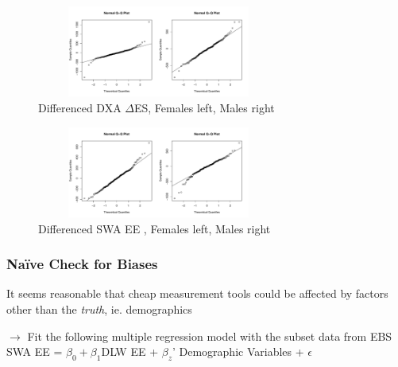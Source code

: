 \documentclass[handout]{beamer}\usepackage[]{graphicx}\usepackage[]{color}
\begin{document}
\begin{frame}

\begin{figure}
\centering
\includegraphics[width=8cm,height=3cm]{dxa_qq.pdf}
\caption{{Differenced DXA $\Delta$ES, Females left, Males right}}
\end{figure}

\begin{figure}
\centering
\includegraphics[width=8cm,height=3cm]{swa_qq.pdf}
\caption{Differenced SWA  EE , Females left, Males right}
\end{figure}


\end{frame}

\begin{frame}
\frametitle{Na{\"i}ve Check for Biases}
It seems reasonable that cheap measurement tools could be affected by factors other than the \emph{truth}, ie. demographics \\

\vspace{0.3cm}

$\rightarrow$ Fit the following multiple regression model with the subset data from EBS\\
SWA EE = $\beta_0 + \beta_1$DLW EE + $\beta_z$' Demographic Variables + $\epsilon$ \\




\end{frame}
\end{document}
